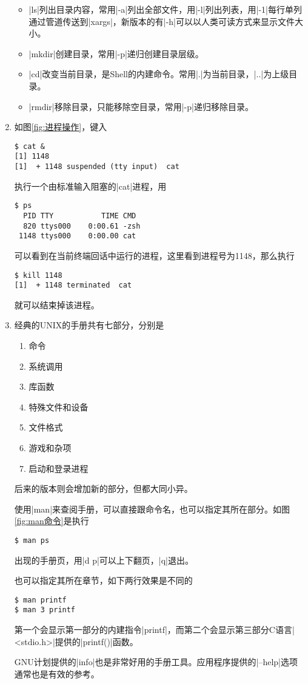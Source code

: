 \documentclass[cs4size,a4paper,nofonts]{ctexart}
\begin{document}
\begin{enumerate}[label={(\arabic*)}]
\begin{itemize}
\item |ls|列出目录内容，常用|-a|列出全部文件，用|-l|列出列表，用|-1|每行单列通过管道传送到|xargs|，新版本的有|-h|可以以人类可读方式来显示文件大小。
\item |mkdir|创建目录，常用|-p|递归创建目录层级。
\item |cd|改变当前目录，是Shell的内建命令。常用|.|为当前目录，|..|为上级目录。
\item |rmdir|移除目录，只能移除空目录，常用|-p|递归移除目录。
\end{itemize}

\item 如图\ref{fig:进程操作}，键入
\begin{Verbatim}
$ cat &
[1] 1148
[1]  + 1148 suspended (tty input)  cat
\end{Verbatim}
执行一个由标准输入阻塞的|cat|进程，用
\begin{Verbatim}
$ ps
  PID TTY           TIME CMD
  820 ttys000    0:00.61 -zsh
 1148 ttys000    0:00.00 cat
\end{Verbatim}
可以看到在当前终端回话中运行的进程，这里看到进程号为1148，那么执行
\begin{Verbatim}
$ kill 1148
[1]  + 1148 terminated  cat
\end{Verbatim}
就可以结束掉该进程。

\begin{figure}[htp]
\end{figure}

\item 经典的UNIX的手册共有七部分，分别是
\begin{enumerate}[label={\arabic*.}]
\item 命令
\item 系统调用
\item 库函数
\item 特殊文件和设备
\item 文件格式
\item 游戏和杂项
\item 启动和登录进程
\end{enumerate}
后来的版本则会增加新的部分，但都大同小异。

使用|man|来查阅手册，可以直接跟命令名，也可以指定其所在部分。如图\ref{fig:man命令}是执行
\begin{Verbatim}
$ man ps
\end{Verbatim}
出现的手册页，用|d p|可以上下翻页，|q|退出。

\begin{figure}[htp]
\end{figure}

也可以指定其所在章节，如下两行效果是不同的
\begin{Verbatim}
$ man printf
$ man 3 printf
\end{Verbatim}
第一个会显示第一部分的内建指令|printf|，而第二个会显示第三部分C语言|<stdio.h>|提供的|printf()|函数。

GNU计划提供的|info|也是非常好用的手册工具。应用程序提供的|--help|选项通常也是有效的参考。

\end{enumerate}
\end{document}
